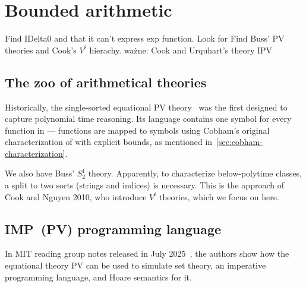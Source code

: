 
\chapter{Bounded arithmetic}\label{chap:bounded-arithmetic}

 Find IDelta0 and that it can't express exp function. Look for
 Find Buss' PV theories and Cook's $V^i$ hierachy.
 ważne: Cook and Urquhart's theory IPV

\section{The zoo of arithmetical theories}
Historically, the single-sorted equational PV theory~\cite{10.1145/800116.803756} was
the first designed to capture polynomial time reasoning.
Its language contains one symbol for every function in  --- functions are mapped to symbols
using Cobham's original characterization of  with explicit bounds, as mentioned in~\ref{sec:cobham-characterization}.

We also have Buss' $S^1_2$ theory. Apparently, to characterize below-polytime classes, a split to two sorts (strings and indices)
is necessary. This is the approach of Cook and Nguyen 2010, who introduce $V^i$ theories, which we focus on here.



\section{IMP~(PV) programming language}
In MIT reading group notes released in July 2025~\cite{Li2025FeasibleMathematics}, the authors show how the equational theory PV
can be used to simulate set theory, an imperative programming language, and Hoare semantics for it.

